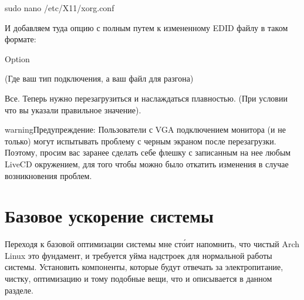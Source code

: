 \documentclass[letterpaper,10pt,russian,openany]{sphinxmanual}
\begin{document}
\begin{sphinxVerbatim}[commandchars=\\\{\}]
sudo nano /etc/X11/xorg.conf 
\end{sphinxVerbatim}

\sphinxAtStartPar
И добавляем туда опцию с полным путем к измененному EDID файлу в таком формате:

\begin{sphinxVerbatim}[commandchars=\\\{\}]
Option      
\end{sphinxVerbatim}

\sphinxAtStartPar
(Где  \sphinxhyphen{} ваш тип подключения, а  ваш файл для разгона)

\sphinxAtStartPar
Все. Теперь нужно перезагрузиться и наслаждаться плавностью.
(При условии что вы указали правильное значение).

\begin{sphinxadmonition}{warning}{Предупреждение:}
\sphinxAtStartPar
Пользователи с VGA подключением монитора (и не только) могут испытывать проблему с черным экраном после перезагрузки.
Поэтому, просим вас заранее сделать себе флешку с записанным на нее любым LiveCD окружением, для того чтобы можно было откатить изменения в случае возникновения проблем.
\end{sphinxadmonition}

\sphinxAtStartPar
{}

\sphinxAtStartPar
{}

\sphinxstepscope


\chapter{Базовое ускорение системы}
\label{\detokenize{source/generic-system-acceleration:generic-system-acceleration}}\label{\detokenize{source/generic-system-acceleration:id1}}\label{\detokenize{source/generic-system-acceleration::doc}}
\sphinxAtStartPar
Переходя к базовой оптимизации системы мне сто́ит напомнить, что чистый Arch Linux \sphinxhyphen{} это фундамент, и требуется уйма надстроек для нормальной работы системы.
Установить компоненты, которые будут отвечать за электропитание, чистку, оптимизацию и тому подобные вещи, что и описывается в данном разделе.
\end{document}
